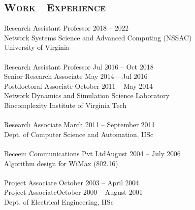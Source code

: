 \documentclass[margin,10pt]{res} %
\begin{document}
\begin{resume}
\section{\textnormal{\textsc{Work\,\,\,\, Experience}}} 
Research Assistant Professor \hfill 2018 -- 2022\\
Network Systems Science and Advanced Computing (NSSAC)\\
University of Virginia\\
~~~\\
{Research Assistant Professor} \hfill Jul 2016 -- Oct 2018\\
Senior Research Associate \hfill May 2014 -- Jul 2016\\
Postdoctoral Associate \hfill October 2011 -- May 2014\\
Network Dynamics and Simulation Science Laboratory\\
Biocomplexity Institute of Virginia Tech\\
~~~\\
Research Associate \hfill March 2011 -- September 2011\\
Dept. of Computer Science and Automation, IISc \\
~~~\\
{Beceem Communications Pvt Ltd}\hfill August 2004 -- July 2006\\
Algorithm design for WiMax (802.16) \\
~~~\\
Project Associate \hfill October 2003 -- April 2004\\ 
Project Associate\hfill October 2000 -- August 2001\\ 
Dept. of Electrical Engineering, IISc \\
\end{resume}

\end{document}
